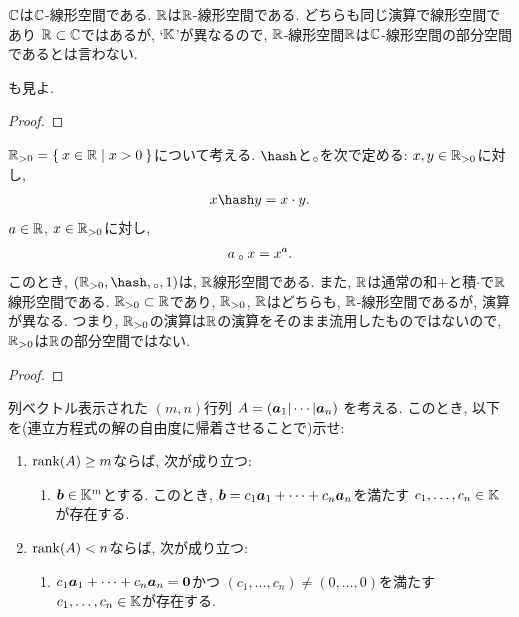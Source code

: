 \begin{example}
  \label{subsp:nonexample:cc}
  $\mathbb{C}$は$\mathbb{C}$-線形空間である.
  $\mathbb{R}$は$\mathbb{R}$-線形空間である.
  どちらも同じ演算で線形空間であり
  $\mathbb{R}\subset \mathbb{C}$ではあるが,
  `$\mathbb{K}$'が異なるので,
  $\mathbb{R}$-線形空間$\mathbb{R}$は$\mathbb{C}$-線形空間の部分空間であるとは言わない.

  も見よ.
\end{example}
\begin{proof}\end{proof}

\begin{example}
  $\mathbb{R}_{>0}=\Set{x\in\mathbb{R}|x>0}$について考える.
  $\pplus$と$\mathbin{{}_\circ}$を次で定める:
  $x,y\in\mathbb{R}_{>0}$に対し,
  \begin{align*}
    x\pplus y =x\cdot y.
  \end{align*}
  $a\in\mathbb{R}$, $x\in\mathbb{R}_{>0}$に対し,
  \begin{align*}
    a\mathbin{{}_\circ} x=x^a.
  \end{align*}
  このとき, $(\RR_{>0},\pplus,\aact,1)$は, $\mathbb{R}$線形空間である.
  また, $\mathbb{R}$は通常の和$+$と積$\cdot$で$\mathbb{R}$線形空間である.
  $\mathbb{R}_{>0}\subset \mathbb{R}$であり, $\mathbb{R}_{>0}$, $\mathbb{R}$はどちらも, $\mathbb{R}$-線形空間であるが, 演算が異なる.
  つまり, $\mathbb{R}_{>0}$の演算は$\mathbb{R}$の演算をそのまま流用したものではないので,
  $\mathbb{R}_{>0}$は$\mathbb{R}$の部分空間ではない.
\end{example}
\begin{proof}\end{proof}

\begin{quiz}
  列ベクトル表示された
  $(m,n)$行列
  $A=(\boldsymbol{a}_1|\cdots|\boldsymbol{a}_n)$
  を考える.
  このとき, 以下を(連立方程式の解の自由度に帰着させることで)示せ:
  \begin{enumerate}
  \item
    $\operatorname{rank}(A)\geq m$ならば,
   次が成り立つ:
   \begin{enumerate}
   \item $\boldsymbol{b}\in\mathbb{K}^m$とする.
     このとき, $\boldsymbol{b}=c_1\boldsymbol{a}_1+\cdots+c_n\boldsymbol{a}_n$を満たす
     $c_1,\ldots,c_n\in\mathbb{K}$が存在する.
   \end{enumerate}
  \item
    $\operatorname{rank}(A)< n$ならば,
   次が成り立つ:
   \begin{enumerate}
   \item 
     $c_1\boldsymbol{a}_1+\cdots+c_n\boldsymbol{a}_n=\boldsymbol{0}$かつ
     $(c_1,\ldots,c_n)\neq (0,\ldots,0)$を満たす
     $c_1,\ldots,c_n\in\mathbb{K}$が存在する.
   \end{enumerate}
  \end{enumerate}
\end{quiz}


